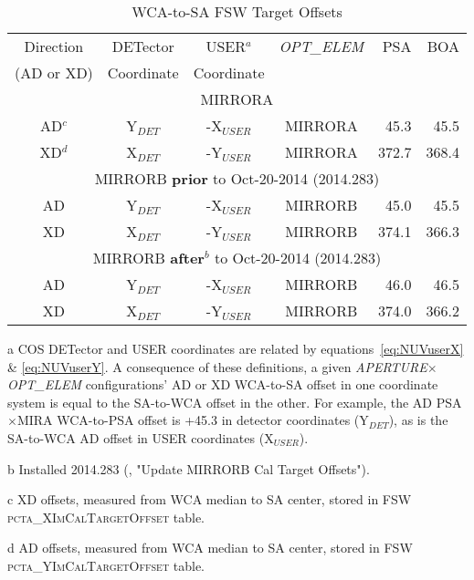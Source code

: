 \begin{center}
\begin{table}[htb!]
\centering
\vspace{-0.1cm}
\footnotesize
	\begin{threeparttable}
	\caption[\textsc{pcta\_[X,Y]ImCalTargetOffset} Values]{ WCA-to-SA FSW Target Offsets}
		\begin{tabular*}{.95\linewidth}{@{\extracolsep{\fill}}ccccrr}
		\toprule
		Direction & DETector & USER$^{a}$ & \textit{OPT\_ELEM}  &	PSA	&	BOA\\
		(AD or XD) & Coordinate &	Coordinate &	&	\\
		\bottomrule
		\midrule
		\multicolumn{6}{c}{MIRRORA}\\
		\midrule
		AD$^c$	&	Y$_{DET}$	&	-X$_{USER}$	&	MIRRORA	&	45.3	&	45.5 \\
		XD$^d$	&	X$_{DET}$	&	-Y$_{USER}$	&	MIRRORA	&	372.7	&	368.4 \\
		\midrule
		\multicolumn{6}{c}{MIRRORB {\bf prior} to Oct-20-2014 (2014.283)}\\
		\midrule
		AD	&	Y$_{DET}$	&	-X$_{USER}$	&	MIRRORB	&	45.0	&	45.5 \\
		XD	&	X$_{DET}$	&	-Y$_{USER}$	&	MIRRORB	&	374.1	&	366.3 \\
		\midrule
		\multicolumn{6}{c}{MIRRORB {\bf after}$^{b}$ to Oct-20-2014 (2014.283)}\\
		\midrule
		AD	&	Y$_{DET}$	&	-X$_{USER}$	&	MIRRORB	&	46.0	&	46.5 \\
		XD	&	X$_{DET}$	&	-Y$_{USER}$	&	MIRRORB	&	374.0	&	366.2 \\
		\bottomrule
		\end{tabular*}
		\label{tab:pctaWCA2SANIM}
		\scriptsize
		\begin{tablenotes}
			\item[a] COS DETector and USER coordinates are related by equations~\ref{eq:NUVuserX} \& \ref{eq:NUVuserY}. A consequence of
			these definitions, a given \textit{APERTURE}$\times$\textit{OPT\_ELEM} configurations' AD or XD WCA-to-SA offset in one coordinate system is equal to the SA-to-WCA offset in the other.
			For example, the AD PSA$\times$MIRA WCA-to-PSA offset is +45.3 in detector coordinates (Y$_{DET}$), as is the SA-to-WCA AD offset in USER coordinates (X$_{USER}$).
			\item[b] Installed 2014.283 (, "Update MIRRORB Cal Target Offsets").
			\item[c] XD  offsets, measured from WCA median to  SA center, stored in  FSW \textsc{pcta\_XImCalTargetOffset} table.
			\item[d] AD  offsets, measured from WCA  median to SA center, stored in  FSW \textsc{pcta\_YImCalTargetOffset} table.
		\end{tablenotes}
		\normalsize
	\end{threeparttable}
\normalsize
\end{table}
\end{center}
